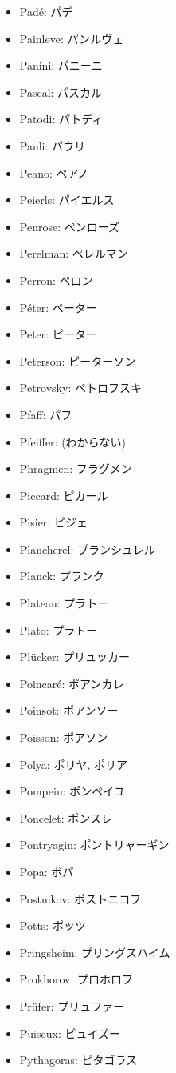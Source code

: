 \documentclass[openany, a4paper, oneside]{jsbook}
\begin{document}
\begin{itemize}
\item Pad\'e: パデ
\item Painleve: パンルヴェ
\item Panini: パニーニ
\item Pascal: パスカル
\item Patodi: パトディ
\item Pauli: パウリ
\item Peano: ペアノ
\item Peierls: パイエルス
\item Penrose: ペンローズ
\item Perelman: ペレルマン
\item Perron: ペロン
\item Péter: ペーター
\item Peter: ピーター
\item Peterson: ピーターソン
\item Petrovsky: ペトロフスキ
\item Pfaff: パフ
\item Pfeiffer: (わからない)
\item Phragmen: フラグメン
\item Piccard: ピカール
\item Pisier: ピジェ
\item Plancherel: プランシュレル
\item Planck: プランク
\item Plateau: プラトー
\item Plato: プラトー
\item Pl\"ucker: プリュッカー
\item Poincar\'e: ポアンカレ
\item Poinsot: ポアンソー
\item Poisson: ポアソン
\item Polya: ポリヤ, ポリア
\item Pompeiu: ポンペイユ
\item Poncelet: ポンスレ
\item Pontryagin: ポントリャーギン
\item Popa: ポパ
\item Postnikov: ポストニコフ
\item Potts: ポッツ
\item Pringsheim: プリングスハイム
\item Prokhorov: プロホロフ
\item Pr\"ufer: プリュファー
\item Puiseux: ピュイズー
\item Pythagoras: ピタゴラス
\end{itemize}
\end{document}
